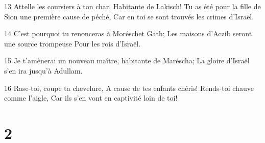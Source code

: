 \par 13 Attelle les coursiers à ton char, Habitante de Lakisch! Tu as été pour la fille de Sion une première cause de péché, Car en toi se sont trouvés les crimes d'Israël.
\par 14 C'est pourquoi tu renonceras à Moréschet Gath; Les maisons d'Aczib seront une source trompeuse Pour les rois d'Israël.
\par 15 Je t'amènerai un nouveau maître, habitante de Maréscha; La gloire d'Israël s'en ira jusqu'à Adullam.
\par 16 Rase-toi, coupe ta chevelure, A cause de tes enfants chéris! Rends-toi chauve comme l'aigle, Car ils s'en vont en captivité loin de toi!

\chapter{2}

